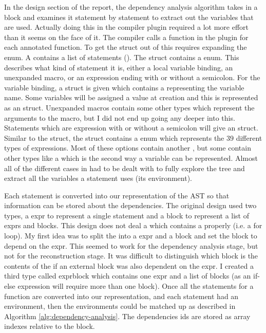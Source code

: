 
In the design section of the report, the dependency analysis algorithm takes in a block and examines it statement by statement to extract out the variables that are used. Actually doing this in the compiler plugin required a lot more effort than it seems on the face of it. The compiler calls a function in the plugin for each annotated function. To get the  struct out of this requires expanding the  enum. A  contains a list of statements (). The  struct contains a  enum. This describes what kind of statement it is, either a local variable binding, an unexpanded macro, or an expression ending with or without a semicolon. For the variable binding, a  struct is given which contains a  representing the variable name. Some variables will be assigned a value at creation and this is represented as an  struct. Unexpanded macros contain some other types which represent the arguments to the macro, but I did not end up going any deeper into this. Statements which are expression with or without a semicolon will give an  struct. Similar to the  struct, the  struct contains a  enum which represents the $39$ different types of expressions. Most of these options contain another , but some contain other types like a  which is the second way a variable can be represented. Almost all of the different cases in  had to be dealt with to fully explore the tree and extract all the variables a statement uses (its environment).

Each statement is converted into our representation of the AST so that information can be stored about the dependencies. The original design used two types, a expr to represent a single statement and a block to represent a list of exprs and blocks. This design does not deal a  which contains a  properly (i.e. a for loop). My first idea was to split the  into a expr and a block and set the block to depend on the expr. This seemed to work for the dependency analysis stage, but not for the reconstruction stage. It was difficult to distinguish which block is the contents of the  if an external block was also dependent on the expr. I created a third type called exprblock which contains one expr and a list of blocks (as an if-else expression will require more than one block). Once all the statements for a function are converted into our representation, and each statement had an environment, then the environments could be matched up as described in Algorithm \ref{alg:dependency-analysis}. The dependencies ids are stored as array indexes relative to the block.

